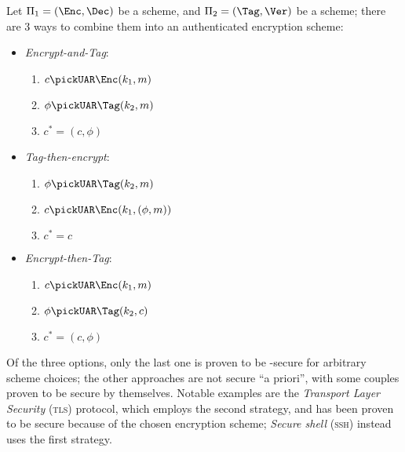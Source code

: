 Let $\Pi_1 = (\Enc, \Dec)$ be a \ske{} scheme, and $\Pi_2 = (\Tag, \Ver)$ be a \mac{} scheme; there are 3 ways to combine them into an authenticated encryption scheme:
\begin{itemize}
    \item \emph{Encrypt-and-Tag}:
    \begin{enumerate}
        \item $c \pickUAR \Enc(k_1, m)$
        \item $\phi \pickUAR \Tag(k_2, m)$
        \item $c^* = (c, \phi)$
    \end{enumerate}
        
    \item \emph{Tag-then-encrypt}:
    \begin{enumerate}
        \item $\phi \pickUAR \Tag(k_2, m)$
        \item $c \pickUAR \Enc(k_1, (\phi, m))$
        \item $c^* = c$
    \end{enumerate}

    \item \emph{Encrypt-then-Tag}:
    \begin{enumerate}
        \item $c \pickUAR \Enc(k_1, m)$
        \item $\phi \pickUAR \Tag(k_2, c)$
        \item $c^* = (c, \phi)$
    \end{enumerate}
\end{itemize}

Of the three options, only the last one is proven to be \cca-secure for arbitrary scheme choices; the other approaches are not secure ``a priori'', with some couples proven to be secure by themselves. Notable examples are the \emph{Transport Layer Security} (\textsc{tls}) protocol, which employs the second strategy, and has been proven to be secure because of the chosen encryption scheme; \emph{Secure shell} (\textsc{ssh}) instead uses the first strategy.

